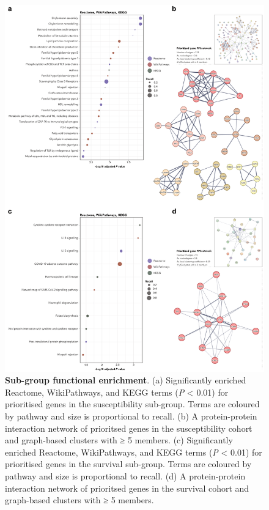 \documentclass[
  11,
  a4paper,
]{article}
\begin{document}
\begin{figure}

{\centering \includegraphics{../img/Supplementary_Figure_7.png}

}

\caption{\textbf{Sub-group functional enrichment}. (a) Significantly
enriched Reactome, WikiPathways, and KEGG terms (\emph{P} \textless{}
0.01) for prioritised genes in the susceptibility sub-group. Terms are
coloured by pathway and size is proportional to recall. (b) A
protein-protein interaction network of prioritsed genes in the
susceptibility cohort and graph-based clusters with ≥ 5 members. (c)
Significantly enriched Reactome, WikiPathways, and KEGG terms (\emph{P}
\textless{} 0.01) for prioritised genes in the survival sub-group. Terms
are coloured by pathway and size is proportional to recall. (d) A
protein-protein interaction network of prioritsed genes in the survival
cohort and graph-based clusters with ≥ 5 members.}

\end{figure}
\end{document}
